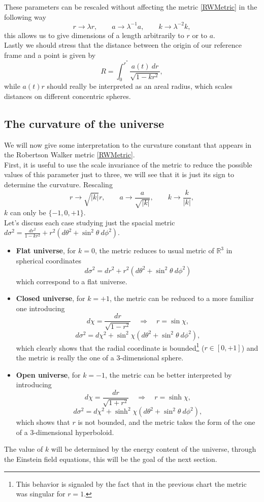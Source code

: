 These parameters can be rescaled without affecting the metric \eqref{RWMetric} in the following way
\begin{equation}
    r\rightarrow\lambda r,\qquad a\rightarrow\lambda^{-1} a,\qquad k\rightarrow\lambda^{-2} k,
\end{equation}
this allows us to give dimensions of a length arbitrarily to $r$ or to $a$.\\
Lastly we should stress that the distance between the origin of our reference frame and a point is given by
\begin{equation}
    R=\int_{0}^{r^*}\frac{a(t)\ dr}{\sqrt{1-kr^2}},
\end{equation}
while $a(t)r$ should really be interpreted as an areal radius, which scales distances on different concentric spheres. 
\subsection{The curvature of the universe}
We will now give some interpretation to the curvature constant that appears in the Robertson Walker metric \eqref{RWMetric}.\\First, it is useful to use the scale invariance of the metric to reduce the possible values of this parameter just to three, we will see that it is just its sign to determine the curvature. Rescaling 
\begin{equation}
    r\rightarrow\sqrt{|k|}r,\qquad a\rightarrow\frac{a}{\sqrt{|k|}},\qquad k\rightarrow\frac{k}{|k|},
\end{equation}  
$k$ can only be $\{-1,0,+1\}$. \\
Let's discuss each case studying just the spacial metric $d\sigma^2=\frac{dr^2}{1-kr^2}+r^2(d\theta^2+\sin^2\theta\ d\phi^2)$.
\begin{itemize}
    \item \textbf{Flat universe}, for $k=0$, the metric reduces to usual metric of $\mathbb{R}^3$ in spherical coordinates $$d\sigma^2= dr^2+r^2(d\theta^2+\sin^2\theta\ d\phi^2)$$ which correspond to a flat universe.
    \item \textbf{Closed universe}, for $k=+1$, the metric can be reduced to a more familiar one introducing $$d\chi=\frac{dr}{\sqrt{1-r^2}}\quad\Rightarrow\quad r=\sin\chi,$$$$d\sigma^2=d\chi^2+\sin^2\chi(d\theta^2+\sin^2\theta\ d\phi^2),$$which clearly shows that the radial coordinate is bounded\footnote{This behavior is signaled by the fact that in the previous chart the metric was singular for $r=1$.} ($r\in[0,+1]$) and the metric is really the one of a $3$-dimensional sphere.
    \item \textbf{Open universe}, for $k=-1$, the metric can be better interpreted by introducing$$d\chi=\frac{dr}{\sqrt{1+r^2}}\quad\Rightarrow\quad r=\sinh\chi,$$$$d\sigma^2=d\chi^2+\sinh^2\chi(d\theta^2+\sin^2\theta\ d\phi^2),$$ which shows that $r$ is not bounded, and the metric takes the form of the one of a $3$-dimensional hyperboloid.
\end{itemize}
The value of $k$ will be determined by the energy content of the universe, through the Einstein field equations, this will be the goal of the next section.
